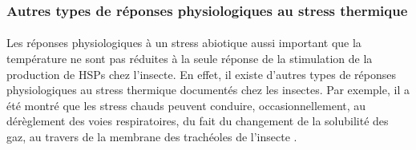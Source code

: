 		\subsubsection{Autres types de réponses physiologiques au stress thermique} %

		\paragraph*{}
		Les réponses physiologiques à un stress abiotique aussi important que la température ne sont pas réduites à la seule réponse de la stimulation de la production de HSPs chez l'insecte.
		En effet, il existe d'autres types de réponses physiologiques au stress thermique documentés chez les insectes.
		Par exemple, il a été montré que les stress chauds peuvent conduire, occasionnellement, au dérèglement des voies respiratoires, du fait du changement de la solubilité des gaz, au travers de la membrane des trachéoles de l'insecte \cite{neven2000}.

		\paragraph*{}

